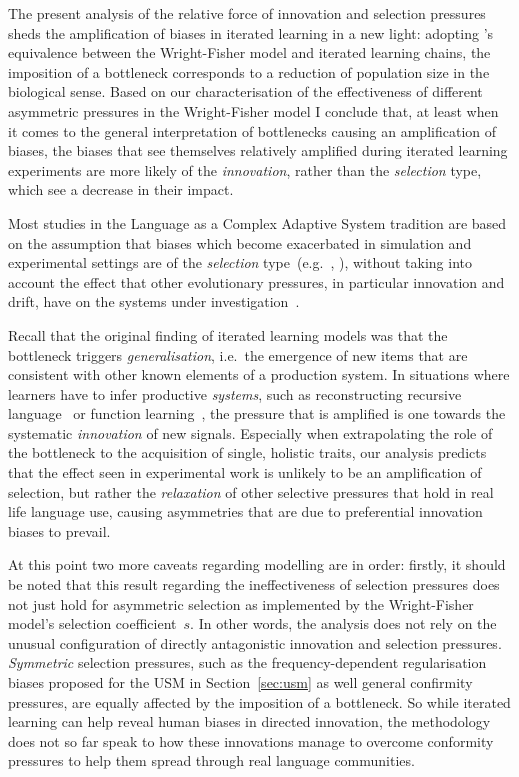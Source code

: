The present analysis of the relative force of innovation and selection pressures sheds the amplification of biases in iterated learning in a new light: adopting \citeauthor{Reali2009}'s equivalence between the Wright-Fisher model and iterated learning chains, the imposition of a bottleneck corresponds to a reduction of population size in the biological sense. Based on our characterisation of the effectiveness of different asymmetric pressures in the Wright-Fisher model I conclude that, at least when it comes to the general interpretation of bottlenecks causing an amplification of biases, the biases that see themselves relatively amplified during iterated learning experiments are more likely of the \emph{innovation}, rather than the \emph{selection} type, which see a decrease in their impact. %

Most studies in the Language as a Complex Adaptive System tradition are based on the assumption that biases which become exacerbated in simulation and experimental settings are of the \emph{selection} type~(e.g.~\citealt[ch.6]{Kirby1999}, \citealt{Chater2010evolution}), without taking into account the effect that other evolutionary pressures, in particular innovation and drift, have on the systems under investigation~\citep[see][p.127-9]{Henrich2008}.

Recall that the original finding of iterated learning models was that the bottleneck triggers \emph{generalisation}, i.e.~the emergence of new items that are consistent with other known elements of a production system. In situations where learners have to infer productive \emph{systems}, such as reconstructing recursive language~\citep{Kirby2002} or function learning~\citep{Griffiths2013}, %
the pressure that is amplified is one towards the systematic \emph{innovation} of new signals.
Especially when extrapolating the role of the bottleneck to the acquisition of single, holistic traits, our analysis predicts that the effect seen in experimental work is unlikely to be an amplification of selection, but rather the \emph{relaxation} of other selective pressures that hold in real life language use, causing asymmetries that are due to preferential innovation biases to prevail.

At this point two more caveats regarding modelling are in order: firstly, it should be noted that this result regarding the ineffectiveness of selection pressures does not just hold for asymmetric selection as implemented by the Wright-Fisher model's selection coefficient~$s$. In other words, the analysis does not rely on the unusual configuration of directly antagonistic innovation and selection pressures. \emph{Symmetric} selection pressures, such as the frequency-dependent regularisation biases proposed for the USM in Section~\ref{sec:usm} as well general confirmity pressures, are equally affected by the imposition of a bottleneck. So while iterated learning can help reveal human biases in directed innovation, the methodology does not so far speak to how these innovations manage to overcome conformity pressures to help them spread through real language communities.

